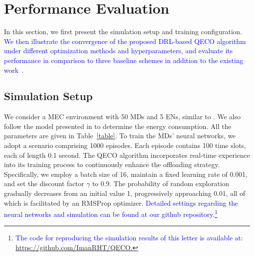 \documentclass[10pt, journal,letterpaper]{IEEEtran}
\begin{document}
\section{Performance Evaluation}\label{section:VI}
In this section, we first present the simulation setup and training configuration. \textcolor{blue}{We then illustrate the convergence of the proposed DRL-based QECO algorithm under different optimization methods and hyperparameters, and evaluate its performance in comparison to three baseline schemes in addition to the existing work~\cite{qiu2020distributed}.}




\subsection{Simulation Setup}
We consider a MEC environment with 50 MDs and 5 ENs, similar to \cite{9253665}. We also follow the model presented in \cite{zhou2021deep} to determine the energy consumption. All the parameters are given in Table~\ref{table}. To train the MDs' neural networks, we adopt a scenario comprising 1000 episodes. Each episode contains 100 time slots, each of length 0.1 second. The QECO algorithm incorporates real-time experience into its training process to continuously enhance the offloading strategy. Specifically, we employ a batch size of 16, maintain a fixed learning rate of 0.001, and set the discount factor $\gamma$ to 0.9. The probability of random exploration gradually decreases from an initial value 1, progressively approaching 0.01, all of which is facilitated by an RMSProp optimizer. \textcolor{blue}{Detailed settings regarding the neural networks and simulation can be found at our github repository.\footnote{\textcolor{blue}{The code for reproducing the simulation results of this letter is available at: \href{https://github.com/ImanRHT/QECO}{https://github.com/ImanRHT/QECO.}}}}
\end{document}
